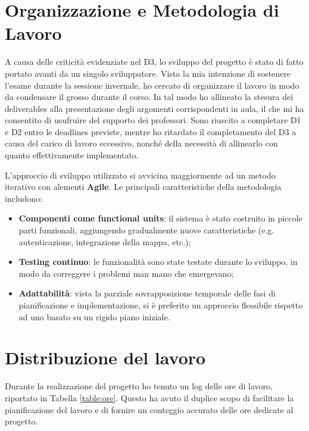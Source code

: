 \documentclass[9pt]{extarticle}
\begin{document}
\customtitle

\tableofcontents
\newpage

\section{Organizzazione e Metodologia di Lavoro}

A causa delle criticità evidenziate nel D3, lo sviluppo del progetto è stato
di fatto portato avanti da un singolo sviluppatore. Vista la mia
intenzione di sostenere l'esame durante la sessione invernale, ho cercato di
organizzare il lavoro in modo da condensare il grosso durante il corso. In tal
modo ho allineato la stesura dei deliverables alla presentazione degli
argomenti corrispondenti in aula, il che mi ha consentito di usufruire del
supporto dei professori. Sono riuscito a completare D1 e D2 entro le deadlines
previste, mentre ho ritardato il completamento del D3 a causa del carico di
lavoro eccessivo, nonché della necessità di allinearlo con quanto effettivamente implementato. \newline

L'approccio di sviluppo utilizzato si avvicina maggiormente ad un metodo iterativo con alementi \textbf{Agile}. Le principali caratteristiche della metodologia includono:
\begin{itemize}
	\item \textbf{Componenti come functional units}: il sistema è stato costruito in piccole parti funzionali, aggiungendo gradualmente nuove caratteristiche (e.g. autenticazione, integrazione della mappa, etc.);
	\item \textbf{Testing continuo}: le funzionalità sono state testate durante lo sviluppo, in modo da correggere i problemi man mano che emergevano;
	\item \textbf{Adattabilità}: vista la parziale sovrapposizione temporale delle fasi di pianificazione e implementazione, si è preferito un approccio flessibile rispetto ad uno basato su un rigido piano iniziale.
\end{itemize}



\section{Distribuzione del lavoro}

Durante la realizzazione del progetto ho tenuto un log delle ore di lavoro,
riportato in Tabella \ref{table:ore}. Questo ha avuto il duplice scopo di
facilitare la pianificazione del lavoro e di fornire un conteggio accurato
delle ore dedicate al progetto.
\end{document}
